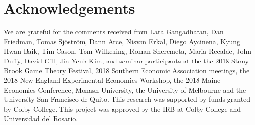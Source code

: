 \documentclass[11pt, letterpaper]{article}
\theoremstyle{plain}
\begin{document}
\section{Acknowledgements}
We are grateful for the comments received from Lata Gangadharan, Dan Friedman, Tomas Sj\"ostr\"om, Dann Arce, Nisvan Erkal, Diego Aycinena, Kyung Hwan Baik, Tim Cason, Tom Wilkening, Roman Sheremeta, Maria Recalde, John Duffy, David Gill, Jin Yeub Kim, and seminar participants at the the 2018 Stony Brook Game Theory Festival, 2018 Southern Economic Association meetings, the 2018 New England Experimental Economics Workshop, the 2018 Maine Economics Conference, Monash University, the University of Melbourne and the University San Francisco de Quito. This research was supported by funds granted by Colby College. This project was approved by the IRB at Colby College and Universidad del Rosario.
\end{document}
